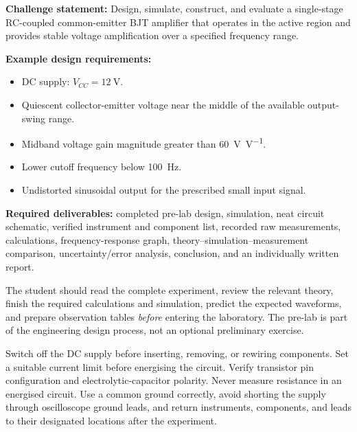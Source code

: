 \documentclass[11pt,a4paper]{article}
\begin{document}
\begin{tcolorbox}[
  colback=white,
  colframe=cetblue,
  title=\textbf{Engineering Challenge and Deliverables},
  boxrule=0.7pt,
  arc=2mm
]
\textbf{Challenge statement:}
Design, simulate, construct, and evaluate a single-stage RC-coupled
common-emitter BJT amplifier that operates in the active region and provides
stable voltage amplification over a specified frequency range.

\textbf{Example design requirements:}
\begin{itemize}
  \item DC supply: $V_{CC}=\SI{12}{\volt}$.
  \item Quiescent collector-emitter voltage near the middle of the available
        output-swing range.
  \item Midband voltage gain magnitude greater than \SI{60}{\volt\per\volt}.
  \item Lower cutoff frequency below \SI{100}{\hertz}.
  \item Undistorted sinusoidal output for the prescribed small input signal.
\end{itemize}

\textbf{Required deliverables:}
completed pre-lab design, simulation, neat circuit schematic, verified
instrument and component list, recorded raw measurements, calculations,
frequency-response graph, theory--simulation--measurement comparison,
uncertainty/error analysis, conclusion, and an individually written report.
\end{tcolorbox}

\begin{prelabbox}
The student should read the complete experiment, review the relevant theory,
finish the required calculations and simulation, predict the expected
waveforms, and prepare observation tables \emph{before} entering the
laboratory. The pre-lab is part of the engineering design process, not an
optional preliminary exercise.
\end{prelabbox}

\begin{safetybox}
Switch off the DC supply before inserting, removing, or rewiring components.
Set a suitable current limit before energising the circuit. Verify transistor
pin configuration and electrolytic-capacitor polarity. Never measure
resistance in an energised circuit. Use a common ground correctly, avoid
shorting the supply through oscilloscope ground leads, and return instruments,
components, and leads to their designated locations after the experiment.
\end{safetybox}
\end{document}
